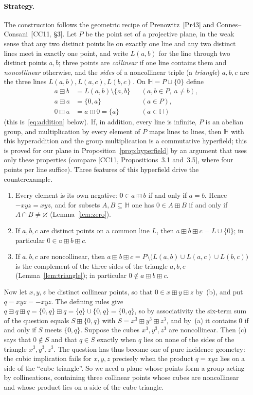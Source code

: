 \documentclass[11pt]{article}
\theoremstyle{plain}
\theoremstyle{definition}
\newcommand{\Hh}{\mathbb{H}}
\newcommand{\bp}{\boxplus}
\begin{document}
\paragraph{Strategy.}
The construction follows the geometric recipe of Prenowitz~[Pr43] and
Connes--Consani~[CC11, \S3].  Let $P$ be the point set of a projective
plane, in the weak sense that any two distinct points lie on exactly one
line and any two distinct lines meet in exactly one point, and write
$L(a,b)$ for the line through two distinct points $a,b$; three points
are \emph{collinear} if one line contains them and \emph{noncollinear}
otherwise, and the \emph{sides} of a noncollinear triple (a
\emph{triangle}) $a,b,c$ are the three lines $L(a,b),L(a,c),L(b,c)$.
On $\Hh=P\cup\{0\}$ define
\[
 \begin{aligned}
 a\bp b&=L(a,b)\setminus\{a,b\} &&(a,b\in P,\ a\neq b),\\
 a\bp a&=\{0,a\} &&(a\in P),\\
 0\bp a&=a\bp0=\{a\} &&(a\in\Hh)
 \end{aligned}
\]
(this is~\eqref{eq:addition} below).  If, in addition, every line is
infinite, $P$ is an abelian group, and
multiplication by every element of $P$ maps lines to lines, then $\Hh$
with this hyperaddition and the group multiplication is a commutative
hyperfield; this is proved for our plane in
Proposition~\ref{prop:hyperfield} by an argument that uses only these
properties (compare [CC11, Propositions~3.1 and~3.5], where four points
per line suffice).  Three features of this hyperfield drive the
counterexample.
\begin{enumerate}
\item[(a)] Every element is its own negative: $0\in a\bp b$ if and only
if $a=b$.  Hence $-xyz=xyz$, and for subsets $A,B\subseteq\Hh$ one has
$0\in A\bp B$ if and only if $A\cap B\neq\varnothing$
(Lemma~\ref{lem:zero}).
\item[(b)] If $a,b,c$ are distinct points on a common line $L$, then
$a\bp b\bp c=L\cup\{0\}$; in particular $0\in a\bp b\bp c$.
\item[(c)] If $a,b,c$ are noncollinear, then
$a\bp b\bp c=P\setminus\bigl(L(a,b)\cup L(a,c)\cup L(b,c)\bigr)$ is
the complement of the three sides of the triangle $a,b,c$
(Lemma~\ref{lem:triangle}); in particular $0\notin a\bp b\bp c$.
\end{enumerate}
Now let $x,y,z$ be distinct collinear points, so that $0\in x\bp y\bp z$
by~(b), and put $q=xyz=-xyz$.  The defining rules give
$q\bp q\bp q=\{0,q\}\bp q=\{q\}\cup\{0,q\}=\{0,q\}$, so by associativity
the six-term sum of the question equals $S\bp\{0,q\}$ with
$S=x^3\bp y^3\bp z^3$, and by~(a) it contains $0$ if and only if $S$
meets $\{0,q\}$.  Suppose the cubes $x^3,y^3,z^3$ are noncollinear.
Then (c) says that $0\notin S$ and that $q\in S$ exactly when $q$ lies
on none of the sides of the triangle $x^3,y^3,z^3$.  The question has
thus become one of pure incidence geometry: the cubic implication fails
for $x,y,z$ precisely when the product $q=xyz$ lies on a side of the
``cube triangle''.  So we need a plane whose points form a group acting
by collineations, containing three collinear points whose cubes are
noncollinear and whose product lies on a side of the cube triangle.
\end{document}
